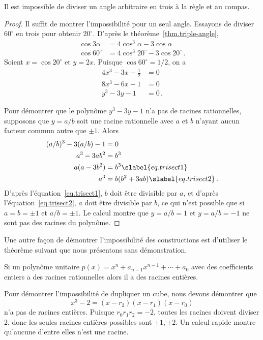 \begin{theorem}
Il est impossible de diviser un angle arbitraire en trois à la règle et au  compas.
\end{theorem}
\begin{proof}
Il suffit de montrer l'impossibilité pour un seul angle. Essayons de diviser $60^\circ$ en trois pour obtenir $20^\circ$. D'après le théorème~\ref{thm.triple-angle},
\begin{align*}
\cos 3\alpha&=4\cos^3\alpha -3\cos\alpha\\
\cos 60^\circ&=4\cos^3 20^\circ -3\cos 20^\circ\,.
\end{align*}
Soient $x=\cos 20^\circ$ et $y=2x$. Puisque $\cos 60^\circ=1/2$, on a 
\begin{align*}
4x^3 -3x-\frac{1}{2} &= 0\\
8x^3-6x-1&=0\\
y^3-3y-1&=0\,.
\end{align*}

Pour démontrer que le polynôme $y^3-3y-1$ n'a pas de racines rationnelles, supposons que $y=a/b$ soit une racine rationnelle avec $a$ et $b$ n'ayant aucun facteur commun autre que $\pm 1$. Alors 
\begin{subequations}
\begin{align}
(a/b)^3-3(a/b)-1&=0\\
a^3-3ab^2&=b^3\\
a(a-3b^2)&=b^3\slabel{eq.trisect1}\\
a^3&=b(b^2+3ab)\slabel{eq.trisect2}\,.
\end{align}
\end{subequations}
D'après  l'équation~\ref{eq.trisect1}, $b$ doit être divisible par $a$, et d'après l'équation~\ref{eq.trisect2}, $a$ doit être divisible par $b$, ce qui n'est possible que si $a=b=\pm 1$ et $a/b=\pm 1$. Le calcul montre que  $y=a/b=1$ et $y=a/b=-1$ ne sont pas des racines du polynôme.
\end{proof}


Une autre façon de démontrer l'impossibilité des constructions est d'utiliser le théorème suivant que nous présentons sans démonstration.

\begin{theorem}\label{thm.factor}
Si un polynôme unitaire  $p(x)=x^n+a_{n-1}x^{n-1}+\cdots+a_0$ avec des coefficients entiers a des racines rationnelles alors il a des racines entières.
\end{theorem}

Pour démontrer l'impossibilité de dupliquer un cube, nous devons démontrer que 
\[
x^3-2=(x-r_2)(x-r_1)(x-r_0)
\]
n'a pas de racines entières. Puisque $r_0r_1r_2=-2$, toutes les racines doivent diviser $2$, donc les seules racines entières possibles sont $\pm 1, \pm 2$. Un calcul rapide montre qu'aucune d'entre elles n'est une racine.

